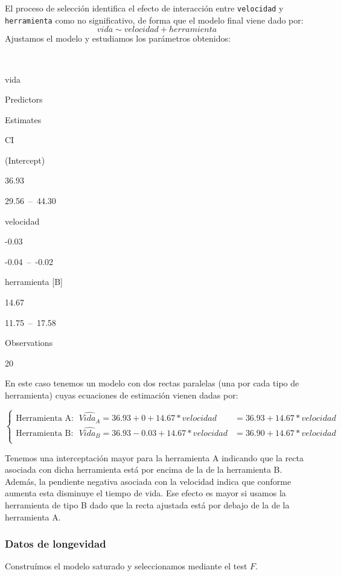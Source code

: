 \documentclass[
]{book}
\theoremstyle{definition}
\theoremstyle{definition}
\theoremstyle{definition}
\theoremstyle{remark}
\begin{document}
El proceso de selección identifica el efecto de interacción entre \texttt{velocidad} y \texttt{herramienta} como no significativo, de forma que el modelo final viene dado por:
\[vida \sim velocidad + herramienta\]
Ajustamos el modelo y estudiamos los parámetros obtenidos:

~

vida

Predictors

Estimates

CI

(Intercept)

36.93

29.56~--~44.30

velocidad

-0.03

-0.04~--~-0.02

herramienta {[}B{]}

14.67

11.75~--~17.58

Observations

20

En este caso tenemos un modelo con dos rectas paralelas (una por cada tipo de herramienta) cuyas ecuaciones de estimación vienen dadas por:

\[
\left\{ 
\begin{array}{lll}
\mbox{Herramienta A}:& \widehat{Vida_{A}} = 36.93 + 0  + 14.67*velocidad &= 36.93 + 14.67*velocidad\\
\mbox{Herramienta B}:& \widehat{Vida_{B}} = 36.93 - 0.03 + 14.67*velocidad &= 36.90 + 14.67*velocidad \\
\end{array}
\right.
\]

Tenemos una interceptación mayor para la herramienta A indicando que la recta asociada con dicha herramienta está por encima de la de la herramienta B. Además, la pendiente negativa asociada con la velocidad indica que conforme aumenta esta disminuye el tiempo de vida. Ese efecto es mayor si usamos la herramienta de tipo B dado que la recta ajustada está por debajo de la de la herramienta A.

\hypertarget{datos-de-longevidad}{%
\subsubsection{Datos de longevidad}\label{datos-de-longevidad}}

Construímos el modelo saturado y seleccionamos mediante el test \(F\).
\end{document}
